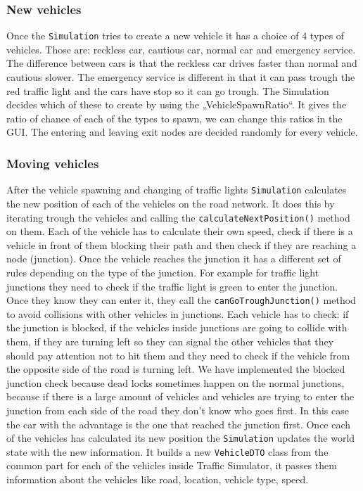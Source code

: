 \documentclass[a4paper,12pt]{article}
\begin{document}
\subsubsection{New vehicles}
Once the \verb|Simulation| tries to create a new vehicle it has a choice of 4 types of vehicles. Those are: reckless car, cautious car, normal car and emergency service. The difference between cars is that the reckless car drives faster than normal and cautious slower. The emergency service is different in that it can pass trough the red traffic light and the cars have stop so it can go trough.
The Simulation decides which of these to create by using the „VehicleSpawnRatio“. It gives the ratio of chance of each of the types to spawn, we can change this ratios in the GUI.
\newline
The entering and leaving exit nodes are decided randomly for every vehicle.
\newline
\subsubsection{Moving vehicles}
After the vehicle spawning and changing of traffic lights \verb|Simulation| calculates the new position of each of the vehicles on the road network. It does this by iterating trough the vehicles and calling the \verb|calculateNextPosition()| method on them. Each of the vehicle has to calculate their own speed, check if there is a vehicle in front of them blocking their path and then check if they are reaching a node (junction). Once the vehicle reaches the junction it has a different set of rules depending on the type of the junction. For example for traffic light junctions they need to check if the traffic light is green to enter the junction. Once they know they can enter it, they call the \verb|canGoTroughJunction()| method to avoid collisions with other vehicles in junctions. Each vehicle has to check: if the junction is blocked, if the vehicles inside junctions are going to collide with them, if they are turning left so they can signal the other vehicles that they should pay attention not to hit them and they need to check if the vehicle from the opposite side of the road is turning left.
\newline
We have implemented the blocked junction check because dead locks sometimes happen on the normal junctions, because if there is a large amount of vehicles and vehicles are trying to enter the junction from each side of the road they don't know who goes first. In this case the car with the advantage is the one that reached the junction first.
\newline
Once each of the vehicles has calculated its new position the \verb|Simulation| updates the world state with the new information. It builds a new \verb|VehicleDTO| class from the common part for each of the vehicles inside Traffic Simulator, it passes them information about the vehicles like road, location, vehicle type, speed.
\end{document}
